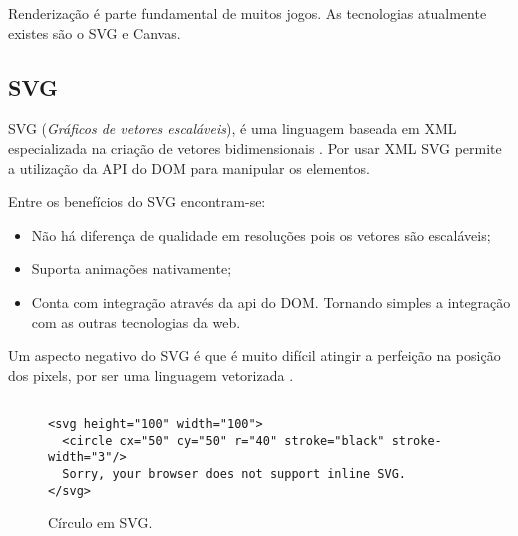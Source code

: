 Renderização é parte fundamental de muitos jogos. As tecnologias atualmente existes são o SVG e Canvas.

\subsection{SVG}
\begin{draft}
SVG (\textit{Gráficos de vetores escaláveis}), é uma linguagem
baseada em XML especializada na criação de vetores bidimensionais
\autocite{html5mostwanted}. Por usar XML SVG permite a utilização da
API do DOM para manipular os elementos.

Entre os benefícios do SVG encontram-se:
\begin{itemize}
\item Não há diferença de qualidade em resoluções pois os vetores são escaláveis;
\item Suporta animações nativamente;
\item Conta com integração através da api do DOM. Tornando simples a integração com as outras tecnologias da web.
\end{itemize}

Um aspecto negativo do SVG é que é muito difícil atingir a
perfeição na posição dos pixels, por ser uma linguagem vetorizada
\autocite{html5mostwanted}.

\end{draft}
\begin{figure}
\centering
\begin{verbatim}

<svg height="100" width="100">
  <circle cx="50" cy="50" r="40" stroke="black" stroke-width="3"/>
  Sorry, your browser does not support inline SVG.
</svg>

\end{verbatim}
\caption{Círculo em SVG.}
\end{figure}
